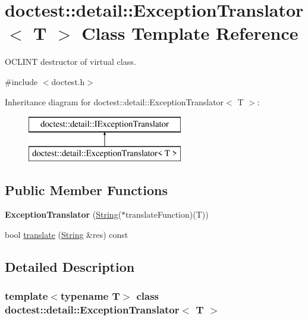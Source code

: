 \hypertarget{classdoctest_1_1detail_1_1_exception_translator}{}\section{doctest\+::detail\+::Exception\+Translator$<$ T $>$ Class Template Reference}
\label{classdoctest_1_1detail_1_1_exception_translator}


O\+C\+L\+I\+NT destructor of virtual class.  




{\ttfamily \#include $<$doctest.\+h$>$}

Inheritance diagram for doctest\+::detail\+::Exception\+Translator$<$ T $>$\+:\begin{figure}[H]
\begin{center}
\leavevmode
\includegraphics[height=2.000000cm]{classdoctest_1_1detail_1_1_exception_translator}
\end{center}
\end{figure}
\subsection*{Public Member Functions}
\begin{DoxyCompactItemize}
\item 
\mbox{\label{classdoctest_1_1detail_1_1_exception_translator_a3ac05488993c40c6ba55ce51a6bf7eae}} 
{\bfseries Exception\+Translator} (\mbox{\hyperlink{classdoctest_1_1_string}{String}}($\ast$translate\+Function)(T))
\item 
bool \mbox{\hyperlink{classdoctest_1_1detail_1_1_exception_translator_a6301f490b029cc2f3113ad5defe373d0}{translate}} (\mbox{\hyperlink{classdoctest_1_1_string}{String}} \&res) const
\end{DoxyCompactItemize}


\subsection{Detailed Description}
\subsubsection*{template$<$typename T$>$\newline
class doctest\+::detail\+::\+Exception\+Translator$<$ T $>$}

